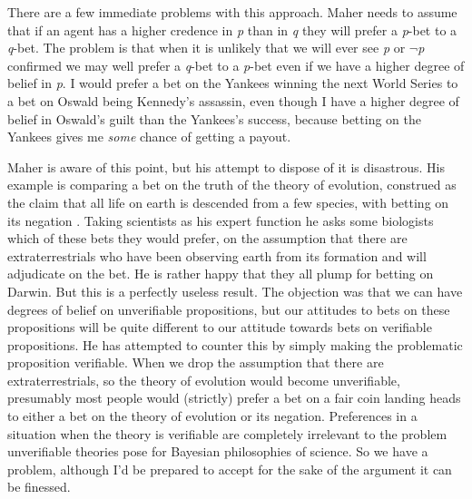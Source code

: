 There are a few immediate problems with this approach. Maher needs to assume that if an agent has a higher credence in \textit{p} than in \textit{q} they will prefer a \textit{p}\nobreakdash-bet to a \textit{q}\nobreakdash-bet. The problem is that when it is unlikely that we will ever see \textit{p} or ${\lnot}$\textit{p} confirmed we may well prefer a \textit{q}\nobreakdash-bet to a \textit{p}\nobreakdash-bet even if we have a higher degree of belief in \textit{p}. I would prefer a bet on the Yankees winning the next World Series to a bet on Oswald being Kennedy's assassin, even though I have a higher degree of belief in Oswald's guilt than the Yankees's success, because betting on the Yankees gives me \textit{some} chance of getting a payout. 

Maher is aware of this point, but his attempt to dispose of it is disastrous. His example is comparing a bet on the truth of the theory of evolution, construed as the claim that all life on earth is descended from a few species, with betting on its negation \citet[89]{Maher1993}. Taking scientists as his expert function he asks some biologists which of these bets they would prefer, on the assumption that there are extraterrestrials who have been observing earth from its formation and will adjudicate on the bet. He is rather happy that they all plump for betting on Darwin. But this is a perfectly useless result. The objection was that we can have degrees of belief on unverifiable propositions, but our attitudes to bets on these propositions will be quite different to our attitude towards bets on verifiable propositions. He has attempted to counter this by simply making the problematic proposition verifiable. When we drop the assumption that there are extraterrestrials, so the theory of evolution would become unverifiable, presumably most people would (strictly) prefer a bet on a fair coin landing heads to either a bet on the theory of evolution or its negation. Preferences in a situation when the theory is verifiable are completely irrelevant to the problem unverifiable theories pose for Bayesian philosophies of science. So we have a problem, although I'd be prepared to accept for the sake of the argument it can be finessed.

